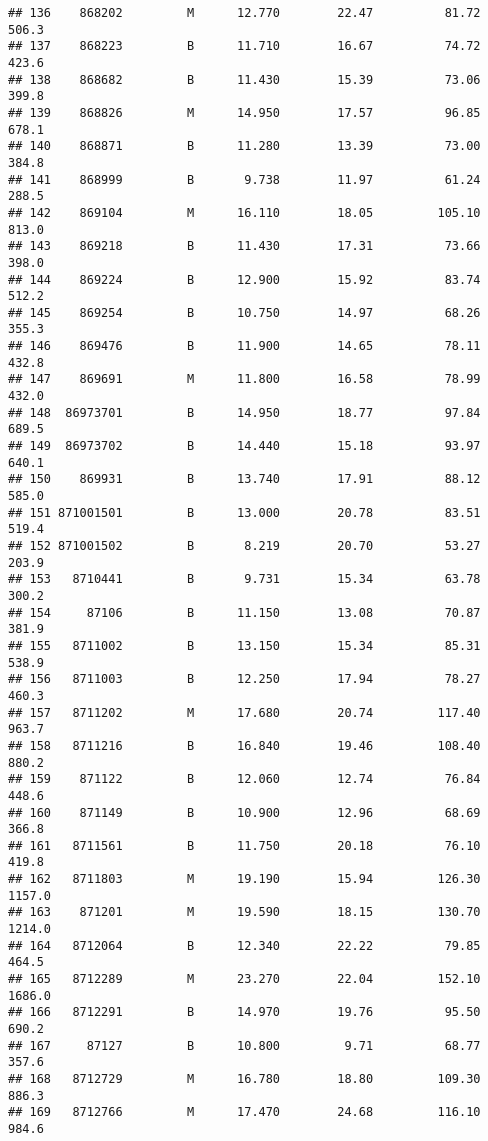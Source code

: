 \documentclass[
]{article}
\begin{document}
\begin{verbatim}
## 136    868202         M      12.770        22.47          81.72     506.3
## 137    868223         B      11.710        16.67          74.72     423.6
## 138    868682         B      11.430        15.39          73.06     399.8
## 139    868826         M      14.950        17.57          96.85     678.1
## 140    868871         B      11.280        13.39          73.00     384.8
## 141    868999         B       9.738        11.97          61.24     288.5
## 142    869104         M      16.110        18.05         105.10     813.0
## 143    869218         B      11.430        17.31          73.66     398.0
## 144    869224         B      12.900        15.92          83.74     512.2
## 145    869254         B      10.750        14.97          68.26     355.3
## 146    869476         B      11.900        14.65          78.11     432.8
## 147    869691         M      11.800        16.58          78.99     432.0
## 148  86973701         B      14.950        18.77          97.84     689.5
## 149  86973702         B      14.440        15.18          93.97     640.1
## 150    869931         B      13.740        17.91          88.12     585.0
## 151 871001501         B      13.000        20.78          83.51     519.4
## 152 871001502         B       8.219        20.70          53.27     203.9
## 153   8710441         B       9.731        15.34          63.78     300.2
## 154     87106         B      11.150        13.08          70.87     381.9
## 155   8711002         B      13.150        15.34          85.31     538.9
## 156   8711003         B      12.250        17.94          78.27     460.3
## 157   8711202         M      17.680        20.74         117.40     963.7
## 158   8711216         B      16.840        19.46         108.40     880.2
## 159    871122         B      12.060        12.74          76.84     448.6
## 160    871149         B      10.900        12.96          68.69     366.8
## 161   8711561         B      11.750        20.18          76.10     419.8
## 162   8711803         M      19.190        15.94         126.30    1157.0
## 163    871201         M      19.590        18.15         130.70    1214.0
## 164   8712064         B      12.340        22.22          79.85     464.5
## 165   8712289         M      23.270        22.04         152.10    1686.0
## 166   8712291         B      14.970        19.76          95.50     690.2
## 167     87127         B      10.800         9.71          68.77     357.6
## 168   8712729         M      16.780        18.80         109.30     886.3
## 169   8712766         M      17.470        24.68         116.10     984.6

\end{verbatim}
\end{document}
